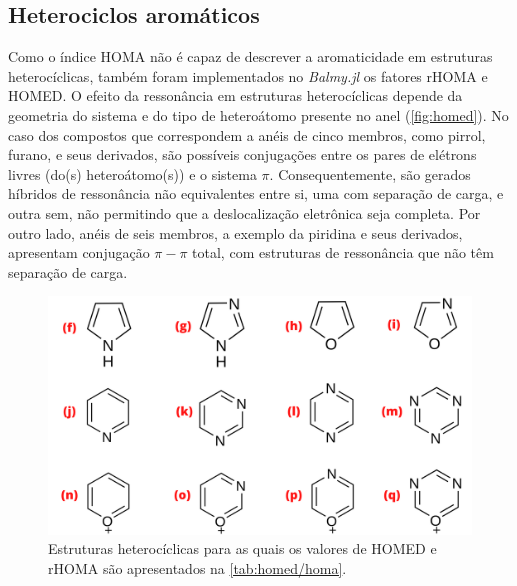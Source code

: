 \newpage

\subsection{Heterociclos aromáticos}

Como o índice \gls{HOMA} não é capaz de descrever a aromaticidade em estruturas heterocíclicas, também foram implementados no \textit{Balmy.jl} os fatores \gls{rHOMA} e \gls{HOMED}. O efeito da ressonância em estruturas heterocíclicas depende da geometria do sistema e do tipo de heteroátomo presente no anel (\autoref{fig:homed}). No caso dos compostos que correspondem a anéis de cinco membros, como pirrol, furano, e seus derivados, são possíveis conjugações entre os pares de elétrons livres (do(s) heteroátomo(s)) e o sistema $\pi$. Consequentemente, são gerados híbridos de ressonância não equivalentes entre si, uma com separação de carga, e outra sem, não permitindo que a deslocalização eletrônica seja completa. Por outro lado, anéis de seis membros, a exemplo da piridina e seus derivados, apresentam conjugação $\pi-\pi$ total, com estruturas de ressonância que não têm separação de carga.

\begin{figure}[htb]
\caption{\label{fig:homed} Estruturas heterocíclicas para as quais os valores de \gls{HOMED} e \gls{rHOMA} são apresentados na \autoref{tab:homed/homa}.}
	\begin{center}
		\includegraphics[width=1.0\textwidth]{images/fig2(7).png}
	\end{center}
\end{figure}

